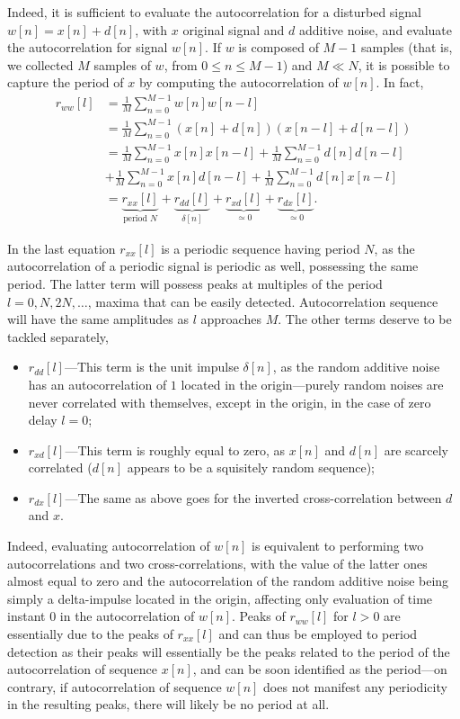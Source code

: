 \documentclass[\documentfontsize, twocolumn]{\classname}
\begin{document}
Indeed, it is sufficient to evaluate the autocorrelation for a disturbed signal $w[n] = x[n] + d[n]$, with $x$ original signal and $d$ additive noise, and evaluate the autocorrelation for signal $w[n]$. If $w$ is composed of $M-1$ samples (that is, we collected $M$ samples of $w$, from $0 \leq n \leq M-1$) and $M \ll N$, it is possible to capture the period of $x$ by computing the autocorrelation of $w[n]$. In fact,
\begin{align*}
    r_{ww}[l] &= \frac 1 M \sum_{n=0}^{M-1} w[n]w[n-l]\\
              &= \frac 1 M \sum_{n=0}^{M-1} (x[n] + d[n])(x[n-l] + d[n-l])\\
              &= \frac 1 M \sum_{n=0}^{M-1} x[n] x[n-l] + \frac 1 M \sum_{n=0}^{M-1} d[n]d[n-l] \\ &+ \frac 1 M \sum_{n=0}^{M-1} x[n]d[n-l] + \frac 1 M \sum_{n=0}^{M-1} d[n]x[n-l]\\
              &= \underbrace{r_{xx}[l]}_{\mbox{period } N} + \underbrace{r_{dd}[l]}_{\delta[n]} + \underbrace{r_{xd}[l]}_{\simeq 0} + \underbrace{r_{dx}[l]}_{\simeq 0}.
\end{align*}

In the last equation $r_{xx}[l]$ is a periodic sequence having period $N$, as the autocorrelation of a periodic signal is periodic as well, possessing the same period. The latter term will possess peaks at multiples of the period $l=0, N, 2N,\dots$, maxima that can be easily detected. Autocorrelation sequence will have the same amplitudes as $l$ approaches $M$. The other terms deserve to be tackled separately,
\begin{itemize}
    \item $r_{dd}[l]$---This term is the unit impulse $\delta[n]$, as the random additive noise has an autocorrelation of $1$ located in the origin---purely random noises are never correlated with themselves, except in the origin, in the case of zero delay $l=0$;
    \item $r_{xd}[l]$---This term is roughly equal to zero, as $x[n]$ and $d[n]$ are scarcely correlated ($d[n]$ appears to be a squi\-si\-te\-ly random sequence);
    \item $r_{dx}[l]$---The same as above goes for the inverted cross-correlation between $d$ and $x$.
\end{itemize}

Indeed, evaluating autocorrelation of $w[n]$ is equivalent to performing two autocorrelations and two cross-correlations, with the value of the latter ones almost equal to zero and the autocorrelation of the random additive noise being simply a delta-impulse located in the origin, affecting only evaluation of time instant $0$ in the autocorrelation of $w[n]$. Peaks of $r_{ww}[l]$ for $l > 0$ are essentially due to the peaks of $r_{xx}[l]$ and can thus be employed to period detection as their peaks will essentially be the peaks related to the period of the autocorrelation of sequence $x[n]$, and can be soon identified as the period---on contrary, if autocorrelation of sequence $w[n]$ does not manifest any periodicity in the resulting peaks, there will likely be no period at all.
\end{document}
